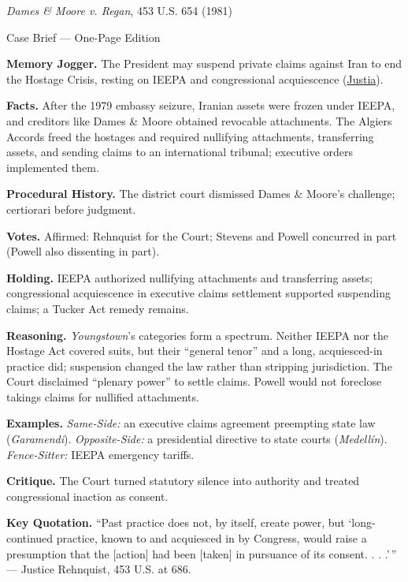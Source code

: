 \documentclass[12pt]{article}
\begin{document}
\begin{center}
{\Large \textit{Dames \& Moore v. Regan}, 453 U.S. 654 (1981)\par}
\vspace{0.3em}
{\normalsize Case Brief --- One-Page Edition\par}
\end{center}

\textbf{Memory Jogger.} The President may suspend private claims against Iran to end the Hostage Crisis, resting on IEEPA and congressional acquiescence (\href{https://supreme.justia.com/cases/federal/us/453/654/}{Justia}).

\textbf{Facts.} After the 1979 embassy seizure, Iranian assets were frozen under IEEPA, and creditors like Dames \& Moore obtained revocable attachments. The Algiers Accords freed the hostages and required nullifying attachments, transferring assets, and sending claims to an international tribunal; executive orders implemented them.

\textbf{Procedural History.} The district court dismissed Dames \& Moore's challenge; certiorari before judgment.

\textbf{Votes.} Affirmed: Rehnquist for the Court; Stevens and Powell concurred in part (Powell also dissenting in part).

\textbf{Holding.} IEEPA authorized nullifying attachments and transferring assets; congressional acquiescence in executive claims settlement supported suspending claims; a Tucker Act remedy remains.

\textbf{Reasoning.} \textit{Youngstown}'s categories form a spectrum. Neither IEEPA nor the Hostage Act covered suits, but their ``general tenor'' and a long, acquiesced-in practice did; suspension changed the law rather than stripping jurisdiction. The Court disclaimed ``plenary power'' to settle claims. Powell would not foreclose takings claims for nullified attachments.

\textbf{Examples.} \emph{Same-Side:} an executive claims agreement preempting state law (\textit{Garamendi}). \emph{Opposite-Side:} a presidential directive to state courts (\textit{Medell\'in}). \emph{Fence-Sitter:} IEEPA emergency tariffs.

\textbf{Critique.} The Court turned statutory silence into authority and treated congressional inaction as consent.

\textbf{Key Quotation.} ``Past practice does not, by itself, create power, but `long-continued practice, known to and acquiesced in by Congress, would raise a presumption that the [action] had been [taken] in pursuance of its consent. . . .'\,'' --- Justice Rehnquist, 453 U.S. at 686.
\end{document}
